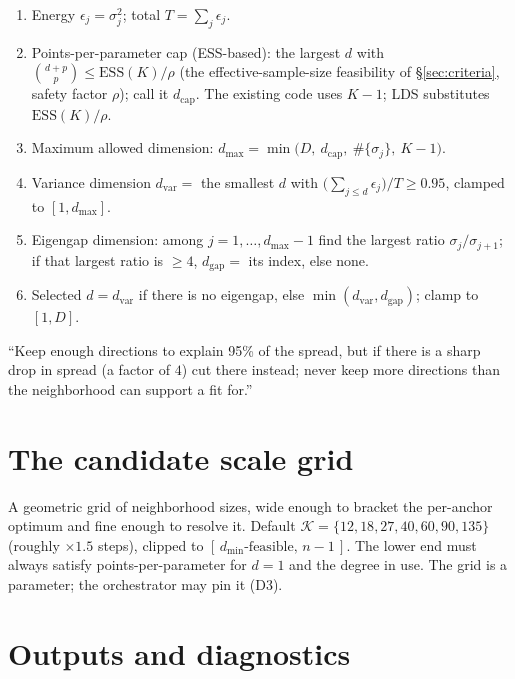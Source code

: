 \documentclass[11pt]{article}
\begin{document}
\begin{enumerate}[leftmargin=1.5em]
\item Energy $\epsilon_j=\sigma_j^2$; total $T=\sum_j \epsilon_j$.
\item Points-per-parameter cap (ESS-based): the largest $d$ with
$\binom{d+p}{p}\le \mathrm{ESS}(K)/\rho$ (the effective-sample-size feasibility of
\S\ref{sec:criteria}, safety factor $\rho$); call it $d_{\text{cap}}$. The existing code
uses $K-1$; LDS substitutes $\mathrm{ESS}(K)/\rho$.
\item Maximum allowed dimension: $d_{\max}=\min\big(D,\ d_{\text{cap}},\ \#\{\sigma_j\},\ K-1\big)$.
\item Variance dimension $d_{\text{var}}=$ the smallest $d$ with
$\big(\sum_{j\le d}\epsilon_j\big)/T\ge 0.95$, clamped to $[1,d_{\max}]$.
\item Eigengap dimension: among $j=1,\dots,d_{\max}-1$ find the largest ratio
$\sigma_j/\sigma_{j+1}$; if that largest ratio is $\ge 4$, $d_{\text{gap}}=$ its index,
else none.
\item Selected $d=d_{\text{var}}$ if there is no eigengap, else
$\min(d_{\text{var}},d_{\text{gap}})$; clamp to $[1,D]$.
\end{enumerate}

\begin{plain}
``Keep enough directions to explain 95\% of the spread, but if there is a sharp drop
in spread (a factor of $4$) cut there instead; never keep more directions than the
neighborhood can support a fit for.''
\end{plain}

\section{The candidate scale grid}\label{sec:grid}

A geometric grid of neighborhood sizes, wide enough to bracket the per-anchor optimum
and fine enough to resolve it. Default $\mathcal{K}=\{12,18,27,40,60,90,135\}$
(roughly $\times1.5$ steps), clipped to $[\,d_{\min}\text{-feasible},\,n-1\,]$. The
lower end must always satisfy points-per-parameter for $d=1$ and the degree in use.
The grid is a parameter; the orchestrator may pin it (D3).

\section{Outputs and diagnostics}\label{sec:outputs}
\end{document}
